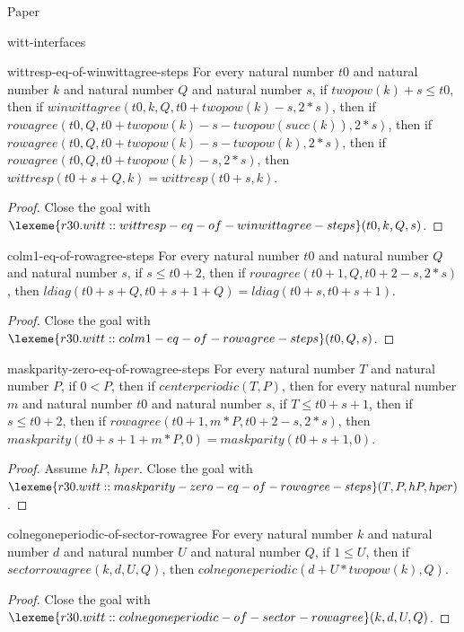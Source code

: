\begin{lexlean}{Paper}
\begin{section}{witt-interfaces}
  \begin{theorem}{wittresp-eq-of-winwittagree-steps}
  For every natural number \(t0\) and natural number \(k\) and natural number \(Q\) and natural number \(s\), if \(twopow(k) + s ≤ t0\), then if \(winwittagree(t0, k, Q, t0 + twopow(k) - s, 2 * s)\), then if \(rowagree(t0, Q, t0 + twopow(k) - s - twopow(succ(k)), 2 * s)\), then if \(rowagree(t0, Q, t0 + twopow(k) - s - twopow(k), 2 * s)\), then if \(rowagree(t0, Q, t0 + twopow(k) - s, 2 * s)\), then \(wittresp(t0 + s + Q, k) = wittresp(t0 + s, k)\).
  \begin{proof}
  Close the goal with \(\lexeme{r30.witt::wittresp-eq-of-winwittagree-steps}(t0, k, Q, s)\).
  \end{proof}
  \end{theorem}

  \begin{theorem}{colm1-eq-of-rowagree-steps}
  For every natural number \(t0\) and natural number \(Q\) and natural number \(s\), if \(s ≤ t0 + 2\), then if \(rowagree(t0 + 1, Q, t0 + 2 - s, 2 * s)\), then \(ldiag(t0 + s + Q, t0 + s + 1 + Q) = ldiag(t0 + s, t0 + s + 1)\).
  \begin{proof}
  Close the goal with \(\lexeme{r30.witt::colm1-eq-of-rowagree-steps}(t0, Q, s)\).
  \end{proof}
  \end{theorem}

  \begin{theorem}{maskparity-zero-eq-of-rowagree-steps}
  For every natural number \(T\) and natural number \(P\), if \(0 < P\), then if \(centerperiodic(T, P)\), then for every natural number \(m\) and natural number \(t0\) and natural number \(s\), if \(T ≤ t0 + s + 1\), then if \(s ≤ t0 + 2\), then if \(rowagree(t0 + 1, m * P, t0 + 2 - s, 2 * s)\), then \(maskparity(t0 + s + 1 + m * P, 0) = maskparity(t0 + s + 1, 0)\).
  \begin{proof}
  Assume \(hP\), \(hper\).
  Close the goal with \(\lexeme{r30.witt::maskparity-zero-eq-of-rowagree-steps}(T, P, hP, hper)\).
  \end{proof}
  \end{theorem}

  \begin{theorem}{colnegoneperiodic-of-sector-rowagree}
  For every natural number \(k\) and natural number \(d\) and natural number \(U\) and natural number \(Q\), if \(1 ≤ U\), then if \(sectorrowagree(k, d, U, Q)\), then \(colnegoneperiodic(d + U * twopow(k), Q)\).
  \begin{proof}
  Close the goal with \(\lexeme{r30.witt::colnegoneperiodic-of-sector-rowagree}(k, d, U, Q)\).
  \end{proof}
  \end{theorem}


\end{section}
\end{lexlean}
